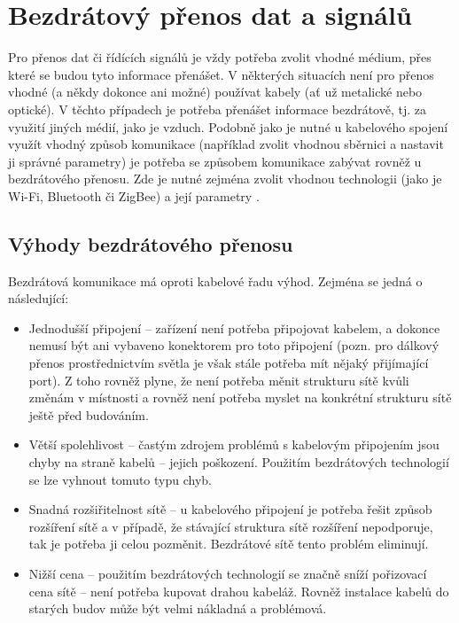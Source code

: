 \section{Bezdrátový přenos dat a signálů}
Pro přenos dat či řídících signálů je vždy potřeba zvolit vhodné médium, přes které se budou tyto informace přenášet. V některých situacích není pro přenos vhodné (a někdy dokonce ani možné) používat kabely (ať už metalické nebo optické). V těchto případech je potřeba přenášet informace bezdrátově, tj. za využití jiných médií, jako je vzduch. 
Podobně jako je nutné u kabelového spojení využít vhodný způsob komunikace (například zvolit vhodnou sběrnici a nastavit ji správné parametry) je potřeba se způsobem komunikace zabývat rovněž u bezdrátového přenosu. Zde je nutné zejména zvolit vhodnou technologii (jako je Wi-Fi, Bluetooth či ZigBee) a její parametry \cite{4technologie}.

\subsection*{Výhody bezdrátového přenosu}
Bezdrátová komunikace má oproti kabelové řadu výhod. Zejména se jedná o následující:

\begin{itemize}
    \item Jednodušší připojení – zařízení není potřeba připojovat kabelem, a dokonce nemusí být ani vybaveno konektorem pro toto připojení (pozn. pro dálkový přenos prostřednictvím světla je však stále potřeba mít nějaký přijímající port). Z toho rovněž plyne, že není potřeba měnit strukturu sítě kvůli změnám v místnosti a rovněž není potřeba myslet na konkrétní strukturu sítě ještě před budováním.
    \item Větší spolehlivost – častým zdrojem problémů s kabelovým připojením jsou chyby na straně kabelů – jejich poškození. Použitím bezdrátových technologií se lze vyhnout tomuto typu chyb.
    \item Snadná rozšiřitelnost sítě – u kabelového připojení je potřeba řešit způsob rozšíření sítě a v případě, že stávající struktura sítě rozšíření nepodporuje, tak je potřeba ji celou pozměnit. Bezdrátové sítě tento problém eliminují.
    \item Nižší cena – použitím bezdrátových technologií se značně sníží pořizovací cena sítě – není potřeba kupovat drahou kabeláž. Rovněž instalace kabelů do starých budov může být velmi nákladná a problémová.
\end{itemize}

